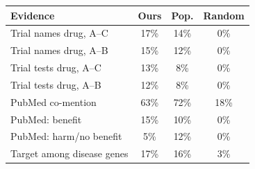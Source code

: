 \begin{tabular}{lccc}
\toprule
Evidence & Ours & Pop. & Random\\
\midrule
Trial names drug, A--C & 17\% & 14\% & 0\%\\
Trial names drug, A--B & 15\% & 12\% & 0\%\\
Trial tests drug, A--C & 13\% & 8\% & 0\%\\
Trial tests drug, A--B & 12\% & 8\% & 0\%\\
PubMed co-mention & 63\% & 72\% & 18\%\\
PubMed: benefit & 15\% & 10\% & 0\%\\
PubMed: harm/no benefit & 5\% & 12\% & 0\%\\
Target among disease genes & 17\% & 16\% & 3\%\\
\bottomrule
\end{tabular}
